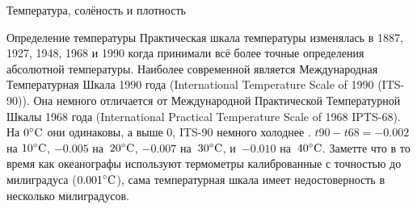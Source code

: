 \begin{chapter}{Температура, солёность и плотность}
\begin{section}{Определение температуры}
Практическая шкала температуры изменялась в 1887, 1927, 1948, 1968 и
1990 когда принимали всё более точные определения абсолютной
температуры. Наиболее современной является Международная Температурная
Шкала 1990 года (International Temperature Scale of 1990
(ITS-90)). Она немного отличается от Международной Практической
Температурной Шкалы 1968 года (International Practical Temperature
Scale of 1968 IPTS-68). На ${0}^\circ\mbox{C}$ они одинаковы, а выше 0,
ITS-90 немного холоднее . $t90-t68 = -0.002$ на ${10}^\circ\mbox{C}$,
$-0.005$ на~${20}^\circ\mbox{C}$, $-0.007$ на~${30}^\circ\mbox{C}$, и~$-0.010$
на~${40}^\circ\mbox{C}$. Заметте что в то время как океанографы используют
термометры калиброванные с точностью до милиградуса
(${0.001}^\circ\mbox{C}$), сама температурная шкала имеет недостоверность в
несколько милиградусов.
%
%

\end{section}


\end{chapter}
